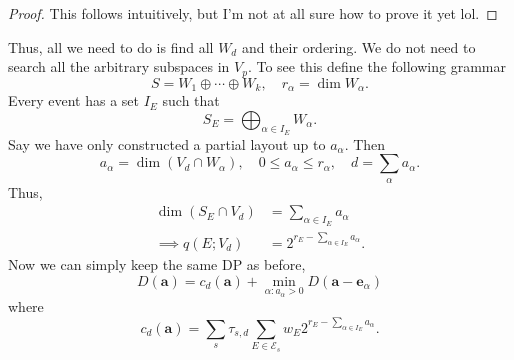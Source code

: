 \documentclass[10pt]{article}
\theoremstyle{remark}
\begin{document}
\begin{proof}
    This follows intuitively, but I'm not at all sure how to prove it yet lol.
\end{proof}

Thus, all we need to do is find all $W_d$ and their ordering. We do not need to search all the arbitrary subspaces in $V_p$. To see this define the following grammar
%
\[
    S = W_1 \oplus \cdots \oplus W_k, \quad r_\alpha = \dim W_\alpha.
\]
%
Every event has a set $I_E$ such that
%
\[
    S_E = \bigoplus_{\alpha \in I_E} W_\alpha.
\]
%
Say we have only constructed a partial layout up to $a_\alpha$. Then
%
\[
    a_\alpha = \dim (V_d \cap W_\alpha), \quad 0 \le a_\alpha \le r_\alpha, \quad d = \sum_\alpha a_\alpha.
\]
%
Thus,
%
\[
    \begin{aligned}
        \dim(S_E \cap V_d) &= \sum_{\alpha \in I_E} a_\alpha \\
        \implies q(E; V_d) &= 2^{r_E - \sum_{\alpha \in I_E} a_\alpha}.
    \end{aligned}
\]
%
Now we can simply keep the same DP as before,
%
\[
D(\bm a) = c_d(\bm a) + \min_{\alpha: a_\alpha > 0} D(\bm a - \bm e_\alpha)
\]
%
where
%
\[
    c_d(\bm a) = \sum_s \tau_{s,d} \sum_{E\in \mathcal{E}_s} w_E 2^{r_E - \sum_{\alpha \in I_E} a_\alpha}.
\]
\end{document}
